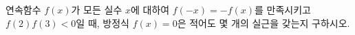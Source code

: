 연속함수 $f(x)$가 모든 실수 $x$에 대하여 $f(-x)=-f(x)$를 만족시키고 $f(2)f(3)<0$일 때, 방정식 $f(x)=0$은 적어도 몇 개의 실근을 갖는지 구하시오.
